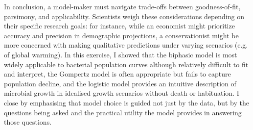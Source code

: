 \documentclass{article}
\begin{document}
In conclusion, a model-maker must navigate trade-offs between goodness-of-fit, parsimony, and applicability. Scientists weigh these considerations depending on their specific research goals: for instance, while an economist might prioritize accuracy and precision in demographic projections, a conservationist might be more concerned with making qualitative predictions under varying scenarios (e.g. of global warming). In this exercise, I showed that the biphasic model is most widely applicable to bacterial population curves although relatively difficult to fit and interpret, the Gompertz model is often appropriate but fails to capture population decline, and the logistic model provides an intuitive description of microbial growth in idealised growth scenarios without death or habituation. I close by emphasising that model choice is guided not just by the data, but by the questions being asked and the practical utility the model provides in answering those questions.

  
  
\end{document}
